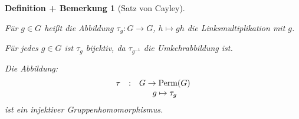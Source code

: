 \documentclass[a4paper,10pt,german]{scrbook}
\theoremstyle{saetze}
\theoremstyle{definitionen}
\newtheorem{DefBem}[Def]{Definition + Bemerkung}
\begin{document}
\begin{DefBem}[Satz von Cayley]
\mbox{}
\begin{enum}
\item Für $g\in G$ heißt die Abbildung $\tau_g:G\to G$, $h \mapsto gh$ die \emph{Linksmultiplikation} mit $g$.

\item Für jedes $g\in G$ ist $\tau_g$ bijektiv, da $\tau_{g^{-1}}$ die Umkehrabbildung ist.

\item Die Abbildung:
\[ \begin{array}{lcc}
    \tau    &   :   &   G \rightarrow \mbox{Perm}(G) \\
            &       &   g \mapsto \tau_g
    \end{array} \]
ist ein injektiver Gruppenhomomorphismus. 
\end{enum}
\end{DefBem}
\end{document}
